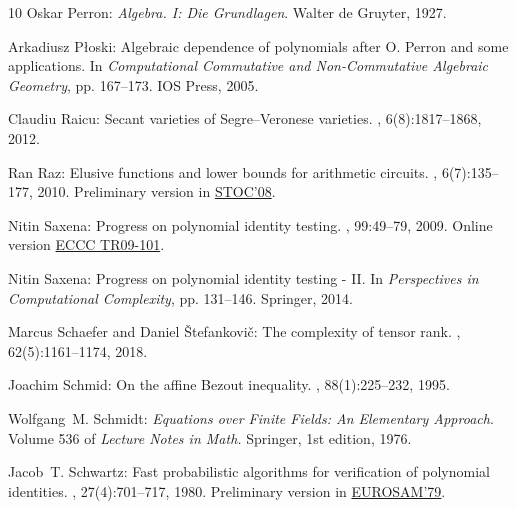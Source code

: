 \documentclass[11pt]{article}
\numberwithin{equation}{section}
\theoremstyle{definition}
\theoremstyle{plain}
\begin{document}
\begin{thebibliography}{10}
{\sc Oskar Perron}: {\em Algebra. I: Die Grundlagen}.
\newblock Walter de Gruyter, 1927.

{\sc Arkadiusz P{\l}oski}: Algebraic dependence of polynomials after {O.
  Perron} and some applications.
\newblock In {\em Computational Commutative and Non-Commutative Algebraic
  Geometry}, pp. 167--173. IOS Press, 2005.

{\sc Claudiu Raicu}: Secant varieties of {Segre--Veronese} varieties.
, 6(8):1817--1868, 2012.

{\sc Ran Raz}: Elusive functions and lower bounds for arithmetic circuits.
, 6(7):135--177, 2010.
\newblock Preliminary version in
  \href{https://dl.acm.org/citation.cfm?doid=1374376.1374479}{STOC'08}.

{\sc Nitin Saxena}: Progress on polynomial identity testing.
, 99:49--79, 2009.
\newblock Online version
  \href{https://eccc.weizmann.ac.il/report/2009/101/}{ECCC TR09-101}.

{\sc Nitin Saxena}: Progress on polynomial identity testing - {II}.
\newblock In {\em Perspectives in Computational Complexity}, pp. 131--146.
  Springer, 2014.

{\sc Marcus Schaefer and Daniel {\v{S}}tefankovi{\v{c}}}: The complexity of
  tensor rank.
, 62(5):1161--1174, 2018.

{\sc Joachim Schmid}: On the affine {B}ezout inequality.
, 88(1):225--232, 1995.
\newblock [\epfmtdoi{10.1007/BF02567819}]

{\sc Wolfgang~M. Schmidt}: {\em Equations over Finite Fields: An Elementary
  Approach}.
\newblock Volume 536 of {\em Lecture Notes in Math.}
\newblock Springer, 1st edition, 1976.

{\sc Jacob~T. Schwartz}: Fast probabilistic algorithms for verification of
  polynomial identities.
, 27(4):701--717, 1980.
\newblock Preliminary version in
  \href{https://link.springer.com/chapter/10.1007/3-540-09519-5_72}{EUROSAM'79}.
\newblock [\epfmtdoi{10.1145/322217.322225}]


\end{thebibliography}
\end{document}
